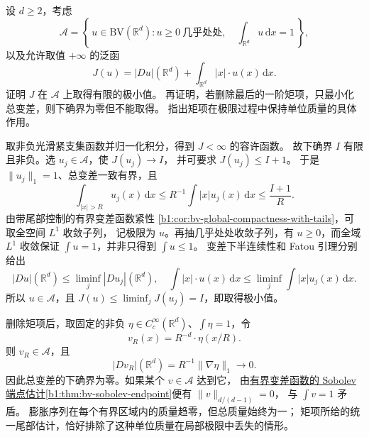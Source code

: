 \begin{optionalexercise}\label{b1:ex:27-confined-bv-minimization}
设 \(d\ge2\)，考虑
\[
 \mathcal A=\left\{\,u\in \mathrm{BV}(\mathbb R^d):
      u\ge0\ \text{几乎处处},\quad\int_{\mathbb R^d}u\,\mathrm dx=1\,\right\},
\]
以及允许取值 \(+\infty\) 的泛函
\[
 J(u)=|Du|(\mathbb R^d)+\int_{\mathbb R^d}|x|\cdot u(x)\,\mathrm dx.
\]
证明 \(J\) 在 \(\mathcal A\) 上取得有限的极小值。
再证明，若删除最后的一阶矩项，只最小化总变差，则下确界为零但不能取得。
指出矩项在极限过程中保持单位质量的具体作用。
\end{optionalexercise}
\begin{solution}
取非负光滑紧支集函数并归一化积分，得到 \(J<\infty\) 的容许函数。
故下确界 \(I\) 有限且非负。选 \(u_j\in\mathcal A\)，使 \(J(u_j)\to I\)，
并可要求 \(J(u_j)\le I+1\)。
于是 \(\|u_j\|_1=1\)、总变差一致有界，且
\[
 \int_{|x|>R}u_j(x)\,\mathrm dx
 \le R^{-1}\int|x|u_j(x)\,\mathrm dx\le\frac{I+1}{R}.
\]
由带尾部控制的有界变差函数紧性%
\cref{b1:cor:bv-global-compactness-with-tails}，可取全空间 \(L^1\) 收敛子列，
记极限为 \(u\)。再抽几乎处处收敛子列，有 \(u\ge0\)，而全域 \(L^1\) 收敛保证
\(\int u=1\)，并非只得到 \(\int u\le1\)。
变差下半连续性和 Fatou 引理分别给出
\[
 |Du|(\mathbb R^d)\le\liminf_j|Du_j|(\mathbb R^d),\quad
 \int|x|\cdot u(x)\,\mathrm dx\le\liminf_j\int|x|u_j(x)\,\mathrm dx.
\]
所以 \(u\in\mathcal A\)，且 \(J(u)\le\liminf_jJ(u_j)=I\)，即取得极小值。

删除矩项后，取固定的非负 \(\eta\in C_c^\infty(\mathbb R^d)\)、\(\int\eta=1\)，令
\[
 v_R(x)=R^{-d}\cdot \eta(x/R).
\]
则 \(v_R\in\mathcal A\)，且
\[
 |Dv_R|(\mathbb R^d)=R^{-1}\|\nabla\eta\|_1\longrightarrow0.
\]
因此总变差的下确界为零。如果某个 \(v\in\mathcal A\) 达到它，
由\hyperref[b1:thm:bv-sobolev-endpoint]{有界变差函数的 Sobolev 端点估计\ref*{b1:thm:bv-sobolev-endpoint}\CJKecglue}便有 \(\|v\|_{d/(d-1)}=0\)，
与 \(\int v=1\) 矛盾。
膨胀序列在每个有界区域内的质量趋零，但总质量始终为一；
矩项所给的统一尾部估计，恰好排除了这种单位质量在局部极限中丢失的情形。
\end{solution}
